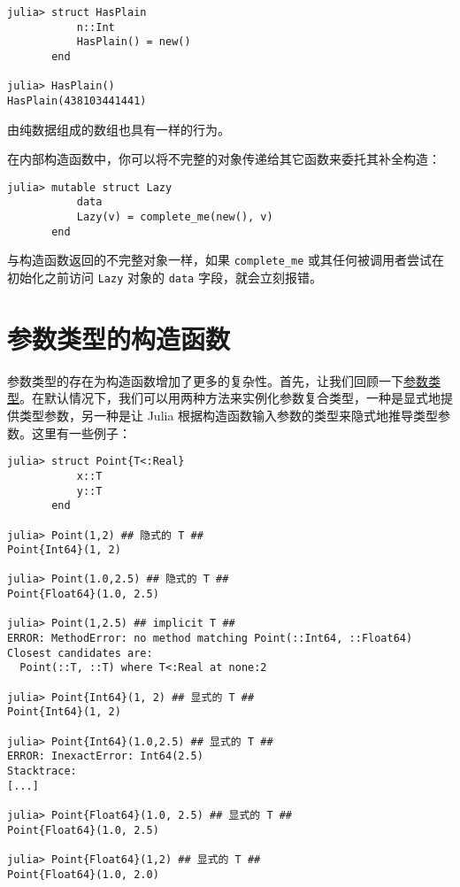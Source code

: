 \begin{verbatim}
julia> struct HasPlain
           n::Int
           HasPlain() = new()
       end

julia> HasPlain()
HasPlain(438103441441)
\end{verbatim}



由纯数据组成的数组也具有一样的行为。



在内部构造函数中，你可以将不完整的对象传递给其它函数来委托其补全构造：




\begin{verbatim}
julia> mutable struct Lazy
           data
           Lazy(v) = complete_me(new(), v)
       end
\end{verbatim}



与构造函数返回的不完整对象一样，如果 \texttt{complete\_me} 或其任何被调用者尝试在初始化之前访问 \texttt{Lazy} 对象的 \texttt{data} 字段，就会立刻报错。



\hypertarget{12775137678629941390}{}


\section{参数类型的构造函数}



参数类型的存在为构造函数增加了更多的复杂性。首先，让我们回顾一下\hyperlink{5603543911318150609}{参数类型}。在默认情况下，我们可以用两种方法来实例化参数复合类型，一种是显式地提供类型参数，另一种是让 Julia 根据构造函数输入参数的类型来隐式地推导类型参数。这里有一些例子：




\begin{verbatim}
julia> struct Point{T<:Real}
           x::T
           y::T
       end

julia> Point(1,2) ## 隐式的 T ##
Point{Int64}(1, 2)

julia> Point(1.0,2.5) ## 隐式的 T ##
Point{Float64}(1.0, 2.5)

julia> Point(1,2.5) ## implicit T ##
ERROR: MethodError: no method matching Point(::Int64, ::Float64)
Closest candidates are:
  Point(::T, ::T) where T<:Real at none:2

julia> Point{Int64}(1, 2) ## 显式的 T ##
Point{Int64}(1, 2)

julia> Point{Int64}(1.0,2.5) ## 显式的 T ##
ERROR: InexactError: Int64(2.5)
Stacktrace:
[...]

julia> Point{Float64}(1.0, 2.5) ## 显式的 T ##
Point{Float64}(1.0, 2.5)

julia> Point{Float64}(1,2) ## 显式的 T ##
Point{Float64}(1.0, 2.0)
\end{verbatim}



